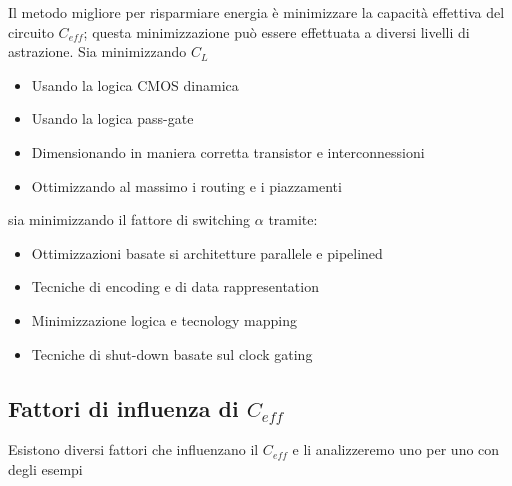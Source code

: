 Il metodo migliore per risparmiare energia è minimizzare la capacità effettiva del circuito $C_{eff}$; questa minimizzazione può essere effettuata a diversi livelli di astrazione. Sia minimizzando $C_L$
\begin{itemize}
\item Usando la logica CMOS dinamica
\item Usando la logica pass-gate
\item Dimensionando in maniera corretta transistor e interconnessioni
\item Ottimizzando al massimo i routing e i piazzamenti
\end{itemize}
sia minimizzando il fattore di switching $\alpha$ tramite:
\begin{itemize}
\item Ottimizzazioni basate si architetture parallele e pipelined
\item Tecniche di encoding e di data rappresentation
\item Minimizzazione logica e tecnology mapping
\item Tecniche di shut-down basate sul clock gating
\end{itemize}
\subsection{Fattori di influenza di $C_{eff}$}
Esistono diversi fattori che influenzano il $C_{eff}$ e li analizzeremo uno per uno con degli esempi
